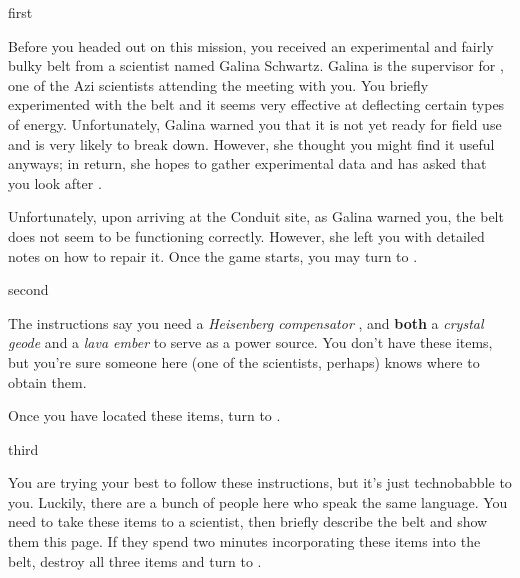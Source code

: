 \documentclass[notebook]{elementals}
\begin{document}

\startnotebook{\nBelt{}}

\begin{page}{first}

Before you headed out on this mission, you received an experimental and fairly bulky belt from a scientist named Galina Schwartz. Galina is the supervisor for \cScientist{\intro}, one of the Azi scientists attending the meeting with you. You briefly experimented with the belt and it seems very effective at deflecting certain types of energy. Unfortunately, Galina warned you that it is not yet ready for field use and is very likely to break down. However, she thought you might find it useful anyways; in return, she hopes to gather experimental data and has asked that you look after \cScientist{}.

Unfortunately, upon arriving at the Conduit site, as Galina warned you, the belt does not seem to be functioning correctly. However, she left you with detailed notes on how to repair it. Once the game starts, you may turn to .

\end{page}

\begin{page}{second}

The instructions say you need a \emph{Heisenberg compensator} \iHeisenbergCompensator{\MYnumber}, and {\bf both} a \emph{crystal geode} \iCrystalGeode{\MYnumber} and a \emph{lava ember} \iLavaEmber{\MYnumber} to serve as a power source.  You don't have these items, but you're sure someone here (one of the scientists, perhaps) knows where to obtain them.

Once you have located these items, turn to . 

\end{page}

\begin{page}{third}

You are trying your best to follow these instructions, but it's just technobabble to you. Luckily, there are a bunch of people here who speak the same language. You need to take these items to a scientist, then briefly describe the belt and show them this page. If they spend two minutes incorporating these items into the belt, destroy all three items and turn to .

\end{page}
\end{document}
